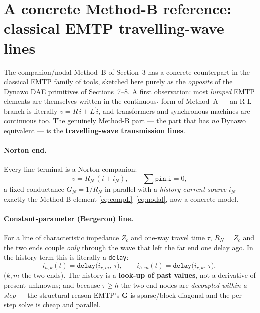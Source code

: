 \documentclass[11pt]{article}
\newcommand{\hstep}{h}
\begin{document}
\section{A concrete Method-B reference: classical EMTP travelling-wave lines}\label{sec:emtp-lines}

The companion/nodal Method~B of Section~3 has a concrete counterpart in the
classical EMTP family of tools, sketched here purely as the \emph{opposite} of the
Dynawo DAE primitives of Sections~7--8. A first observation: most \emph{lumped}
EMTP elements are themselves written in the continuous $\dot{}$ form of
Method~A --- an R-L branch is literally $v=R\,i+L\,\dot i$, and transformers and
synchronous machines are continuous too. The genuinely Method-B part --- the part
that has \emph{no} Dynawo equivalent --- is the \textbf{travelling-wave
transmission lines}.

\paragraph{Norton end.} Every line terminal is a Norton companion:
\begin{equation}
v = R_N\,(i + i_N),\qquad \textstyle\sum \texttt{pin.i}=0,
\label{eq:emtp-norton}
\end{equation}
a fixed conductance $G_N=1/R_N$ in parallel with a \emph{history current source}
$i_N$ --- exactly the Method-B element \eqref{eq:compL}--\eqref{eq:nodal}, now a
concrete model.

\paragraph{Constant-parameter (Bergeron) line.} For a line of characteristic
impedance $Z_c$ and one-way travel time $\tau$, $R_N=Z_c$ and the two ends couple
\emph{only} through the wave that left the far end one delay ago. In
the history term this is literally a \texttt{delay}:
\begin{equation}
i_{h,k}(t) = \texttt{delay}\big(i_{r,m},\,\tau\big),\qquad
i_{h,m}(t) = \texttt{delay}\big(i_{r,k},\,\tau\big),
\label{eq:emtp-bergeron}
\end{equation}
($k,m$ the two ends). The history is a \textbf{look-up of past values}, not a
derivative of present unknowns; and because $\tau\ge\hstep$ the two end nodes are
\emph{decoupled within a step} --- the structural reason EMTP's $\mathbf G$ is
sparse/block-diagonal and the per-step solve is cheap and parallel.
\end{document}
